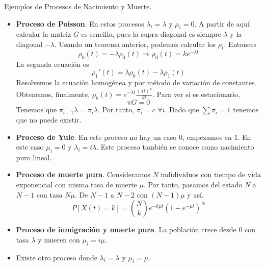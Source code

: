 \documentclass[PREyA.tex]{subfiles}
\begin{document}
\begin{defi} Ejemplos de Procesos de Nacimiento y Muerte.
\begin{itemize}
\item \textbf{Proceso de Poisson}. En estos procesos $\lambda_i = \lambda$ y $\mu_i = 0$. A partir de aquí calcular la matriz $G$ es sencillo, pues la supra diagonal es siempre $\lambda$ y la diagonal $-\lambda$. Usando un teorema anterior, podemos calcular los $\rho_t$. Entonces
$$
\rho_0(t)=-\lambda \rho_0 (t)  \Rightarrow \rho_0(t) = ke^{-\lambda t}
$$
La segunda ecuación es
$$
\rho_1'(t) = \lambda \rho_0(t) - \lambda \rho_1(t)
$$
Resolvemos la ecuación homogénea y por método de variación de constantes. Obtenemos, finalmente, $\rho_k(t) = e^{-\lambda t} \frac{(\lambda t)^k}{k!}$. Para ver si es estacionario,
$$
\pi G = 0
$$
Tenemos que $\pi_{i-1} \lambda = \pi_i \lambda$. Por tanto, $\pi_i = c$ $\forall i$. Dado que $\sum \pi_i = 1$ tenemos que no puede existir.
\item \textbf{Proceso de Yule}. En este proceso no hay un caso $0$, empezamos en $1$. En este caso $\mu_i = 0$ y $\lambda_i =i \lambda $. Este proceso también se conoce como nacimiento puro lineal.
\item \textbf{Proceso de muerte pura}. Consideramos $N$ indidividuos con tiempo de vida exponencial con misma tasa de muerte $\mu$. Por tanto, pasamos del estado $N$ a $N-1$ con tasa $N\mu$. De $N-1$ a $N-2$ con $(N-1)\mu$ y así.
$$
P[X(t)=k] = \binom{N}{k}e^{-k\mu t} (1-e^{-\mu t})^N
$$
\item \textbf{Proceso de inmigración y muerte pura}. La población crece desde $0$ con tasa $\lambda$ y mueren con $\mu_i = i \mu$.
\item Existe otro proceso donde $\lambda_i = \lambda$ y $\mu_i = \mu$.

\end{itemize}
\end{defi}
\end{document}
